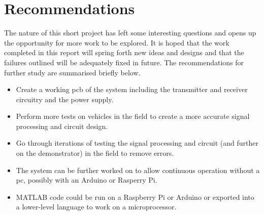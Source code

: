 \documentclass[class=report,11pt,crop=false]{standalone}
\begin{document}
\chapter{Recommendations \label{ch:recommendations}}
\vspace{-1cm}
The nature of this short project has left some interesting questions and opens up the opportunity for more work to be explored. It is hoped that the work completed in this report will spring forth new ideas and designs and that the failures outlined will be adequately fixed in future. The recommendations for further study are summarised briefly below.

\begin{itemize}
    \item Create a working \gls{pcb} of the system including the transmitter and receiver circuitry and the power supply.
    \item Perform more tests on vehicles in the field to create a more accurate signal processing and circuit design.
    \item Go through iterations of testing the signal processing and circuit (and further on the demonstrator) in the field to remove errors.
    \item The system can be further worked on to allow continuous operation without a \gls{pc}, possibly with an Arduino or Rasperry Pi.
    \item \textsc{MATLAB} code could be run on a Raspberry Pi or Arduino or exported into a lower-level language to work on a microprocessor.
\end{itemize}

\ifstandalone

\printnoidxglossary[type=\acronymtype,nonumberlist]
\fi
\end{document}
